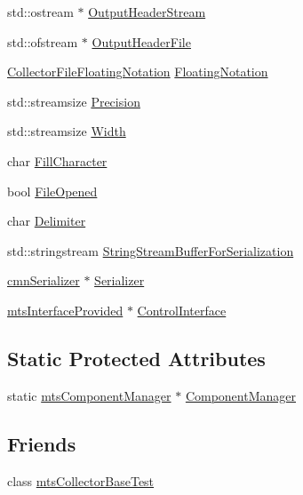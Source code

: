\begin{DoxyCompactItemize}
\item 
std\+::ostream $\ast$ \hyperlink{classmts_collector_base_aa58c68b0e196175b2f0b35f8a2877c54}{Output\+Header\+Stream}
\item 
std\+::ofstream $\ast$ \hyperlink{classmts_collector_base_ac11bfb1b9eceb30e20bb216454e8d067}{Output\+Header\+File}
\item 
\hyperlink{group__cisst_multi_task_gad5d486fde9f8105e4de551d00026ea93}{Collector\+File\+Floating\+Notation} \hyperlink{classmts_collector_base_a1f80a8a534930afcbeade8a12f7d63e3}{Floating\+Notation}
\item 
std\+::streamsize \hyperlink{classmts_collector_base_a86d6b8c24e20957932325ce8183d0abf}{Precision}
\item 
std\+::streamsize \hyperlink{classmts_collector_base_add0435d1bd0dfaed9f54bc82831ca3ea}{Width}
\item 
char \hyperlink{classmts_collector_base_a7d28e7a5dc2c367f963a53f9b786776d}{Fill\+Character}
\item 
bool \hyperlink{classmts_collector_base_a051e5495fad8d0ade499d031e8d9ffbc}{File\+Opened}
\item 
char \hyperlink{classmts_collector_base_a7d711ebe23e8573509789daa9e7392e6}{Delimiter}
\item 
std\+::stringstream \hyperlink{classmts_collector_base_a782f339bd561cc62d195544fdb873834}{String\+Stream\+Buffer\+For\+Serialization}
\item 
\hyperlink{classcmn_serializer}{cmn\+Serializer} $\ast$ \hyperlink{classmts_collector_base_abf646aaaee11b73bf1fff9f31131fac1}{Serializer}
\item 
\hyperlink{classmts_interface_provided}{mts\+Interface\+Provided} $\ast$ \hyperlink{classmts_collector_base_abfd24852cb33dc25956b49ed2896ac10}{Control\+Interface}
\end{DoxyCompactItemize}
\subsection*{Static Protected Attributes}
\begin{DoxyCompactItemize}
\item 
static \hyperlink{mts_task_manager_8h_aa743a07890f6b7715c62cc9384bf994b}{mts\+Component\+Manager} $\ast$ \hyperlink{classmts_collector_base_a5d4cca6b7e903dec79a349efc63ba8a0}{Component\+Manager}
\end{DoxyCompactItemize}
\subsection*{Friends}
\begin{DoxyCompactItemize}
\item 
class \hyperlink{classmts_collector_base_a6743a1c340e3a1cc2078915e17f6678e}{mts\+Collector\+Base\+Test}
\end{DoxyCompactItemize}
